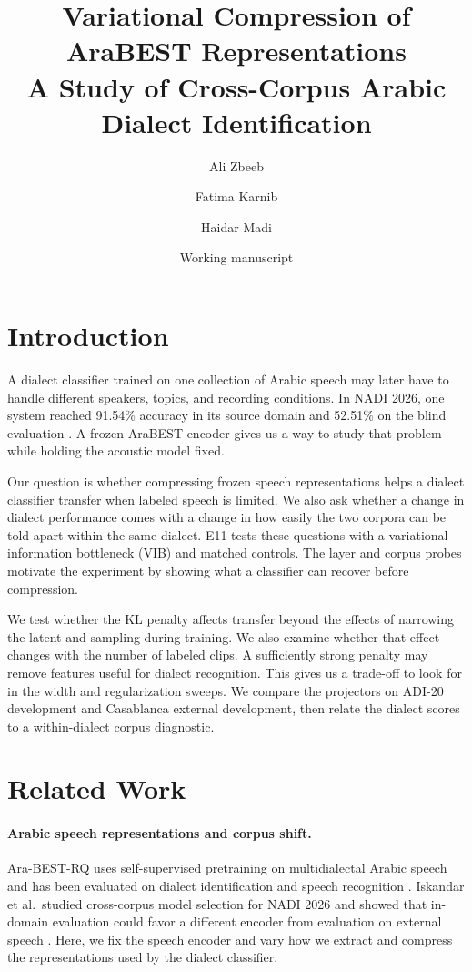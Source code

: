 \documentclass[11pt]{article}
\title{Variational Compression of AraBEST Representations\\\large A Study of Cross-Corpus Arabic Dialect Identification}
\author{Ali Zbeeb \and Fatima Karnib \and Haidar Madi}
\date{Working manuscript}
\begin{document}
\maketitle

\section{Introduction}
A dialect classifier trained on one collection of Arabic speech may later have to handle different speakers, topics, and recording conditions. In NADI 2026, one system reached 91.54\% accuracy in its source domain and 52.51\% on the blind evaluation \cite{iskandar}. A frozen AraBEST encoder gives us a way to study that problem while holding the acoustic model fixed.

Our question is whether compressing frozen speech representations helps a dialect classifier transfer when labeled speech is limited. We also ask whether a change in dialect performance comes with a change in how easily the two corpora can be told apart within the same dialect. E11 tests these questions with a variational information bottleneck (VIB) and matched controls. The layer and corpus probes motivate the experiment by showing what a classifier can recover before compression.

We test whether the KL penalty affects transfer beyond the effects of narrowing the latent and sampling during training. We also examine whether that effect changes with the number of labeled clips. A sufficiently strong penalty may remove features useful for dialect recognition. This gives us a trade-off to look for in the width and regularization sweeps. We compare the projectors on ADI-20 development and Casablanca external development, then relate the dialect scores to a within-dialect corpus diagnostic.

\section{Related Work}
\paragraph{Arabic speech representations and corpus shift.}
Ara-BEST-RQ uses self-supervised pretraining on multidialectal Arabic speech and has been evaluated on dialect identification and speech recognition \cite{arabest}. Iskandar et al.\ studied cross-corpus model selection for NADI 2026 and showed that in-domain evaluation could favor a different encoder from evaluation on external speech \cite{iskandar}. Here, we fix the speech encoder and vary how we extract and compress the representations used by the dialect classifier.
\end{document}

